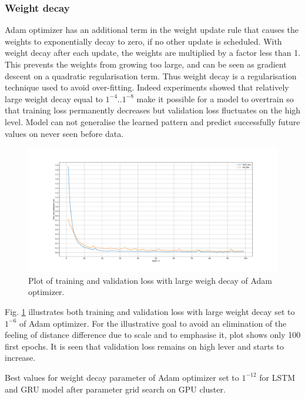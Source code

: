 \subsubsection{Weight decay}
Adam optimizer has an additional term in the weight update rule that causes the weights to exponentially decay to zero, if no other update is scheduled. With weight decay after each update, the weights are multiplied by a factor less than 1. This prevents the weights from growing too large, and can be seen as gradient descent on a quadratic regularisation term. Thus weight decay is a regularisation technique used to avoid over-fitting. Indeed experiments showed that relatively large weight decay equal to $1^{-4} .. 1^{-8}$ make it possible for a model to overtrain so that training loss permanently decreases but validation loss fluctuates on the high level. Model can not generalise the learned pattern and predict successfully future values on never seen before data. 
\begin{figure}[htb]
	\begin{center}
		\includegraphics[width=1\textwidth, keepaspectratio]{gfx/lstm1_weight_decay_high.pdf}
		\caption{\label{fig:wd} Plot of training and validation loss with large weigh decay of Adam optimizer.}
	\end{center}
\end{figure}

Fig. \ref{fig:wd} illustrates both training and validation loss with large weight decay set to $1^{-6}$ of Adam optimizer. For the illustrative goal to avoid an elimination of the feeling of distance difference due to scale and to emphasise it, plot shows only 100 first epochs. It is seen that validation loss remains on high lever and starts to increase.  

Best values for weight decay parameter of Adam optimizer set to  $1^{-12}$ for LSTM and GRU model after parameter grid search on GPU cluster.

